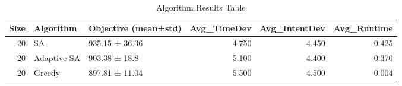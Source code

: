 \begin{table}
\caption{Algorithm Results Table}
\label{tab:algorithm_results_table}
\begin{tabular}{rllrrr}
\toprule
Size & Algorithm & Objective (mean±std) & Avg_TimeDev & Avg_IntentDev & Avg_Runtime \\
\midrule
20 & SA & 935.15 ± 36.36 & 4.750 & 4.450 & 0.425 \\
20 & Adaptive SA & 903.38 ± 18.8 & 5.100 & 4.400 & 0.370 \\
20 & Greedy & 897.81 ± 11.04 & 5.500 & 4.500 & 0.004 \\
\bottomrule
\end{tabular}
\end{table}
